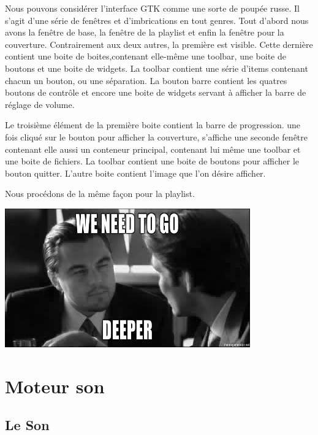 \documentclass[12pt,a4paper]{report}
\begin{document}
Nous pouvons considérer l'interface GTK comme une sorte de poupée russe. Il s'agit d'une série de fenêtres et d'imbrications en tout genres.
Tout d'abord nous avons la fenêtre de base, la fenêtre de la playlist et enfin la fenêtre pour la couverture. Contrairement aux deux autres, la première est visible.
Cette dernière contient une boite de boites,contenant elle-même une toolbar, une boite de boutons et une boite de widgets. La toolbar contient une série d'items contenant chacun un bouton, ou une séparation.
La bouton barre contient les quatres boutons de contrôle et encore une boite de widgets servant à afficher la barre de réglage de volume.

Le troisième élément de la première boite contient la barre de progression.
une fois cliqué sur le bouton pour afficher la couverture, s'affiche une seconde fenêtre contenant elle aussi un conteneur principal, contenant lui même une toolbar et une boite de fichiers. La toolbar contient une boite de boutons pour afficher le bouton quitter. L'autre boite contient l'image que l'on désire afficher.

Nous procédons de la même façon pour la playlist.

\begin{center}
\includegraphics[scale =0.6]{we-need-to-go-deeper.jpg}
\end{center}

\chapter{Moteur son}
\section{Le Son}
\end{document}
